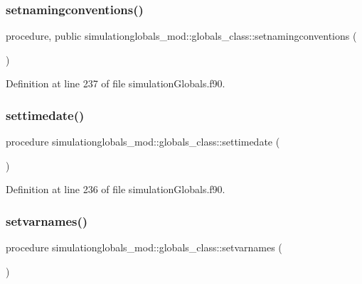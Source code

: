 \subsubsection{\texorpdfstring{setnamingconventions()}{setnamingconventions()}}
{\footnotesize\ttfamily procedure, public simulationglobals\+\_\+mod\+::globals\+\_\+class\+::setnamingconventions (\begin{DoxyParamCaption}{ }\end{DoxyParamCaption})}



Definition at line 237 of file simulation\+Globals.\+f90.

\mbox{\label{structsimulationglobals__mod_1_1globals__class_a9afa580356002f4a94376ad3f925cb35}} 
\subsubsection{\texorpdfstring{settimedate()}{settimedate()}}
{\footnotesize\ttfamily procedure simulationglobals\+\_\+mod\+::globals\+\_\+class\+::settimedate (\begin{DoxyParamCaption}{ }\end{DoxyParamCaption})\hspace{0.3cm}{\ttfamily [private]}}



Definition at line 236 of file simulation\+Globals.\+f90.

\mbox{\label{structsimulationglobals__mod_1_1globals__class_ac9fcf75928fccae1c6ac5c98603ed9b8}} 
\subsubsection{\texorpdfstring{setvarnames()}{setvarnames()}}
{\footnotesize\ttfamily procedure simulationglobals\+\_\+mod\+::globals\+\_\+class\+::setvarnames (\begin{DoxyParamCaption}{ }\end{DoxyParamCaption})\hspace{0.3cm}{\ttfamily [private]}}



